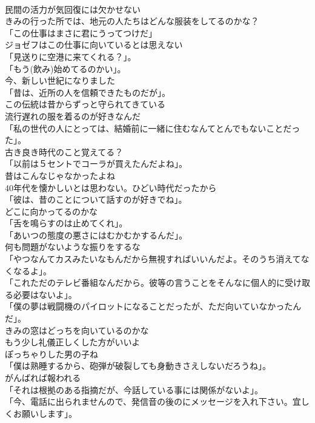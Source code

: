 \documentclass[8pt]{extreport}
\begin{document}
\begin{CJK}{UTF8}{min}
\\	民間の活力が気回復には欠かせない	
\\	きみの行った所では、地元の人たちはどんな服装をしてるのかな？	
\\	「この仕事はまさに君にうってつけだ」	
\\	ジョゼフはこの仕事に向いているとは思えない	
\\	「見送りに空港に来てくれる？」。	
\\	「もう(飲み)始めてるのかい」。	
\\	今、新しい世紀になりました	
\\	「昔は、近所の人を信頼できたものだが」。	
\\	この伝統は昔からずっと守られてきている	
\\	流行遅れの服を着るのが好きなんだ	
\\	「私の世代の人にとっては、結婚前に一緒に住むなんてとんでもないことだった」。	
\\	古き良き時代のこと覚えてる？	
\\	「以前は５セントでコーラが買えたんだよね」。	
\\	昔はこんなじゃなかったよね	
\\	40年代を懐かしいとは思わない。ひどい時代だったから	
\\	「彼は、昔のことについて話すのが好きでね」。	
\\	どこに向かってるのかな	
\\	「舌を鳴らすのは止めてくれ」。	
\\	「あいつの態度の悪さにはむかむかするんだ」。	
\\	何も問題がないような振りをするな	
\\	「やつなんてカスみたいなもんだから無視すればいいんだよ。そのうち消えてなくなるよ」。	
\\	「これただのテレビ番組なんだから。彼等の言うことをそんなに個人的に受け取る必要はないよ」。	
\\	「僕の夢は戦闘機のパイロットになることだったが、ただ向いていなかったんだ」。	
\\	きみの窓はどっちを向いているのかな	
\\	もう少し礼儀正しくした方がいいよ	
\\	ぽっちゃりした男の子ね	
\\	「僕は熟睡するから、砲弾が破裂しても身動きさえしないだろうね」。	
\\	がんばれば報われる	
\\	「それは根拠のある指摘だが、今話している事には関係がないよ」。	
\\	「今、電話に出られませんので、発信音の後のにメッセージを入れ下さい。宜しくお願いします」。	

\end{CJK}
\end{document}
